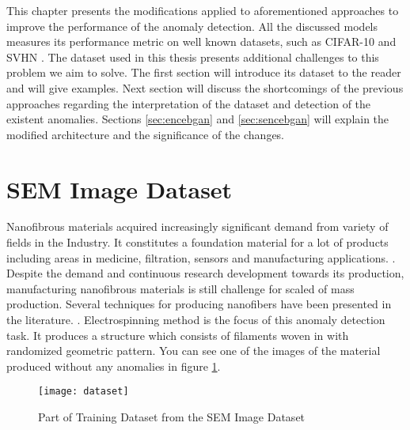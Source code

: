 
\begingroup

This chapter presents the modifications applied to aforementioned approaches to improve the
performance of the anomaly detection. All the discussed models measures its performance metric on
well known datasets, such as CIFAR-10 \cite{cifar10} and SVHN \cite{Netzer2011ReadingDI}. The
dataset used in this thesis presents additional challenges to this problem we aim to solve. The
first section will introduce its dataset to the reader and will give examples. Next section will
discuss the shortcomings of the previous approaches regarding the interpretation of the dataset and
detection of the existent anomalies. Sections \ref{sec:encebgan} and \ref{sec:sencebgan} will
explain the modified architecture and the significance of the changes.

\section{SEM Image Dataset}
\label{sec:sem}

Nanofibrous materials acquired increasingly significant demand from variety of fields in the
Industry. It constitutes a foundation material for a lot of products including areas in medicine,
filtration, sensors and manufacturing applications. \cite{carrera2016defect}. Despite the demand and
continuous research development towards its production, manufacturing nanofibrous materials is still
challenge for scaled of mass production. Several techniques for producing nanofibers have been
presented in the literature. \cite{carrera2016defect}. Electrospinning method is the focus of this
anomaly detection task. It produces a structure which consists of filaments woven in with randomized
geometric pattern. You can see one of the images of the material produced without any anomalies in
figure \ref{fig:data_norm}.

\begin{figure}[h!]
	\centering
	\texttt{[image: dataset]}
	\caption{Part of Training Dataset from the SEM Image Dataset \cite{sem}}
	\label{fig:data_norm}
\end{figure}

